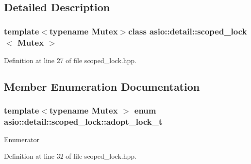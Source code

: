 \subsection{Detailed Description}
\subsubsection*{template$<$typename Mutex$>$class asio\+::detail\+::scoped\+\_\+lock$<$ Mutex $>$}



Definition at line 27 of file scoped\+\_\+lock.\+hpp.



\subsection{Member Enumeration Documentation}
\hypertarget{classasio_1_1detail_1_1scoped__lock_a85a2e4163d034f8449aa4f42ea9a00bf}{}
\subsubsection[{adopt\+\_\+lock\+\_\+t}]{\setlength{\rightskip}{0pt plus 5cm}template$<$typename Mutex $>$ enum {\bf asio\+::detail\+::scoped\+\_\+lock\+::adopt\+\_\+lock\+\_\+t}}\label{classasio_1_1detail_1_1scoped__lock_a85a2e4163d034f8449aa4f42ea9a00bf}
\begin{Desc}
\item[Enumerator]\par
\begin{description}
\item[{\em 
\hypertarget{classasio_1_1detail_1_1scoped__lock_a85a2e4163d034f8449aa4f42ea9a00bfa54c63380b373ee584131d2bfc194f83e}{}adopt\+\_\+lock\label{classasio_1_1detail_1_1scoped__lock_a85a2e4163d034f8449aa4f42ea9a00bfa54c63380b373ee584131d2bfc194f83e}
}]\end{description}
\end{Desc}


Definition at line 32 of file scoped\+\_\+lock.\+hpp.



